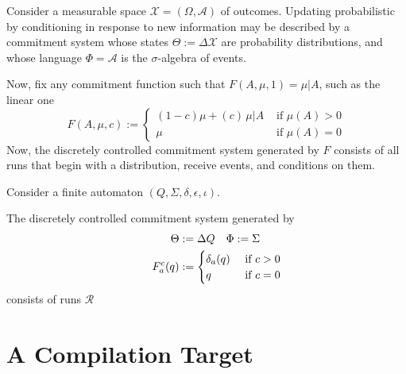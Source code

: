 \documentclass{article}
\begin{document}
\begin{example}
    Consider a measurable space $\mathcal X = (\Omega, \mathcal A)$ of outcomes.
    Updating probabilistic by conditioning in response to new information may be described by a commitment system whose states $\Theta := \Delta \mathcal X$ are probability distributions, and whose language $\Phi = \mathcal A$ is the $\sigma$-algebra of events.

    Now, fix any commitment function such that $F(A,\mu,1) = \mu | A$, such as the linear one
    \[
        F(A, \mu, c) :=
         \begin{cases}
            (1-c) \mu + (c)\, \mu | A & \text{~if~} \mu(A) > 0 \\
            \mu & \text{~if~} \mu(A)=0
        \end{cases}
    \]
    Now, the discretely controlled commitment system generated by $F$ consists of all runs that begin with a distribution, receive events, and conditions on them.
\end{example}

\begin{example}
    Consider a finite automaton $(Q, \Sigma, \delta, \epsilon, \iota)$.

    The discretely controlled commitment system generated by
    \begin{align*}
        \Theta &:= \Delta Q &&
            \Phi := \Sigma
            \\
        F^c_{a}(q) &:= \mathrlap{
            \begin{cases}
                \delta_a(q) & \text{ if } c > 0 \\
                q & \text{ if } c = 0
            \end{cases}}
    \end{align*}
    consists of runs $\mathcal R$
\end{example}




\section{A Compilation Target}
\end{document}
